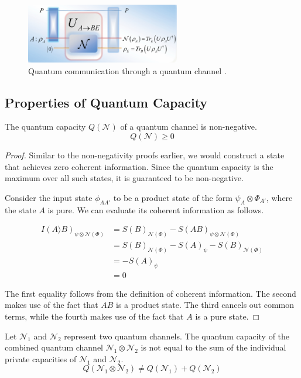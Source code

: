 \begin{figure}[H]
    \centering
    \includegraphics[width=0.6\textwidth]{figures/quantum_communication_quantum_channel.png}
    \caption{Quantum communication through a quantum channel \cite{Gyongyosi_2018}.}
\end{figure}

\subsection{Properties of Quantum Capacity}

\begin{theorem}
The quantum capacity $Q(\mathcal{N})$ of a quantum channel is non-negative.
$$Q(\mathcal{N}) \geq 0$$
\end{theorem}

\begin{proof}
Similar to the non-negativity proofs earlier, we would construct a state that achieves zero coherent information. Since the quantum capacity is the maximum over all such states, it is guaranteed to be non-negative.

Consider the input state $\phi_{AA'}$ to be a product state of the form $\psi_A \otimes \Phi_{A'}$, where the state $A$ is pure. We can evaluate its coherent information as follows.

\begin{align*}
I(A \rangle B)_{\psi \otimes \mathcal{N}(\Phi)} &= S(B)_{\mathcal{N}(\Phi)} - S(AB)_{\psi \otimes \mathcal{N}(\Phi)} \\
&= S(B)_{\mathcal{N}(\Phi)} - S(A)_{\psi} - S(B)_{\mathcal{N}(\Phi)} \\
&= - S(A)_{\psi} \\
&= 0
\end{align*}

The first equality follows from the definition of coherent information. The second makes use of the fact that $AB$ is a product state. The third cancels out common terms, while the fourth makes use of the fact that $A$ is a pure state.
\end{proof}

\begin{theorem}
Let $\mathcal{N}_1$ and $\mathcal{N}_2$ represent two quantum channels. The quantum capacity of the combined quantum channel $\mathcal{N}_1 \otimes \mathcal{N}_2$ is not equal to the sum of the individual private capacities of $\mathcal{N}_1$ and $\mathcal{N}_2$.
$$Q(\mathcal{N}_1 \otimes \mathcal{N}_2) \neq Q(\mathcal{N}_1) + Q(\mathcal{N}_2)$$
\end{theorem}

